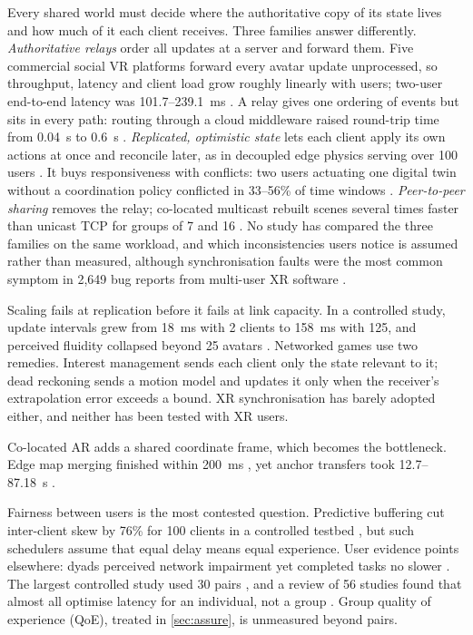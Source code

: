 Every shared world must decide where the authoritative copy of its state lives and how much of it each client receives. Three families answer differently. \emph{Authoritative relays} order all updates at a server and forward them. Five commercial social VR platforms forward every avatar update unprocessed, so throughput, latency and client load grow roughly linearly with users; two-user end-to-end latency was 101.7--239.1~ms \cite{W4307020344}. A relay gives one ordering of events but sits in every path: routing through a cloud middleware raised round-trip time from 0.04~s to 0.6~s \cite{W4386499017}. \emph{Replicated, optimistic state} lets each client apply its own actions at once and reconcile later, as in decoupled edge physics serving over 100 users \cite{W4404050807}. It buys responsiveness with conflicts: two users actuating one digital twin without a coordination policy conflicted in 33--56\% of time windows \cite{W7168268649}. \emph{Peer-to-peer sharing} removes the relay; co-located multicast rebuilt scenes several times faster than unicast TCP for groups of 7 and 16 \cite{W7147356863}. No study has compared the three families on the same workload, and which inconsistencies users notice is assumed rather than measured, although synchronisation faults were the most common symptom in 2,649 bug reports from multi-user XR software \cite{W7166703064}.

Scaling fails at replication before it fails at link capacity. In a controlled study, update intervals grew from 18~ms with 2 clients to 158~ms with 125, and perceived fluidity collapsed beyond 25 avatars \cite{W2922194619}. Networked games use two remedies. Interest management sends each client only the state relevant to it; dead reckoning sends a motion model and updates it only when the receiver's extrapolation error exceeds a bound. XR synchronisation has barely adopted either, and neither has been tested with XR users.

Co-located AR adds a shared coordinate frame, which becomes the bottleneck. Edge map merging finished within 200~ms \cite{W4311118480}, yet anchor transfers took 12.7--87.18~s \cite{W4411499419}.

Fairness between users is the most contested question. Predictive buffering cut inter-client skew by 76\% for 100 clients in a controlled testbed \cite{W7168249167}, but such schedulers assume that equal delay means equal experience. User evidence points elsewhere: dyads perceived network impairment yet completed tasks no slower \cite{W4392600587}. The largest controlled study used 30 pairs \cite{W7163944086}, and a review of 56 studies found that almost all optimise latency for an individual, not a group \cite{W7154321690}. Group quality of experience (QoE), treated in \cref{sec:assure}, is unmeasured beyond pairs.

